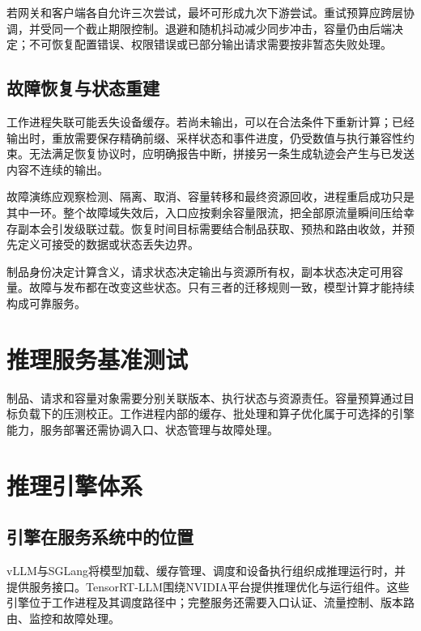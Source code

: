 \documentclass[../textbook.tex]{subfiles}
\begin{document}
若网关和客户端各自允许三次尝试，最坏可形成九次下游尝试。重试预算应跨层协调，并受同一个截止期限控制。退避和随机抖动减少同步冲击，容量仍由后端决定；不可恢复配置错误、权限错误或已部分输出请求需要按非暂态失败处理。

\subsection{故障恢复与状态重建}
工作进程失联可能丢失设备缓存。若尚未输出，可以在合法条件下重新计算；已经输出时，重放需要保存精确前缀、采样状态和事件进度，仍受数值与执行兼容性约束。无法满足恢复协议时，应明确报告中断，拼接另一条生成轨迹会产生与已发送内容不连续的输出。

故障演练应观察检测、隔离、取消、容量转移和最终资源回收，进程重启成功只是其中一环。整个故障域失效后，入口应按剩余容量限流，把全部原流量瞬间压给幸存副本会引发级联过载。恢复时间目标需要结合制品获取、预热和路由收敛，并预先定义可接受的数据或状态丢失边界。

\begin{note}[模型服务的一致性边界与状态迁移]
制品身份决定计算含义，请求状态决定输出与资源所有权，副本状态决定可用容量。故障与发布都在改变这些状态。只有三者的迁移规则一致，模型计算才能持续构成可靠服务。
\end{note}

\section{推理服务基准测试}

制品、请求和容量对象需要分别关联版本、执行状态与资源责任。容量预算通过目标负载下的压测校正。工作进程内部的缓存、批处理和算子优化属于可选择的引擎能力，服务部署还需协调入口、状态管理与故障处理。




\section{推理引擎体系}

\subsection{引擎在服务系统中的位置}
vLLM与SGLang将模型加载、缓存管理、调度和设备执行组织成推理运行时，并提供服务接口\cite{vllm2026framework,sglang2026framework}。TensorRT-LLM围绕NVIDIA平台提供推理优化与运行组件\cite{nvidia2026tensorrtframework}。这些引擎位于工作进程及其调度路径中；完整服务还需要入口认证、流量控制、版本路由、监控和故障处理。
\end{document}
